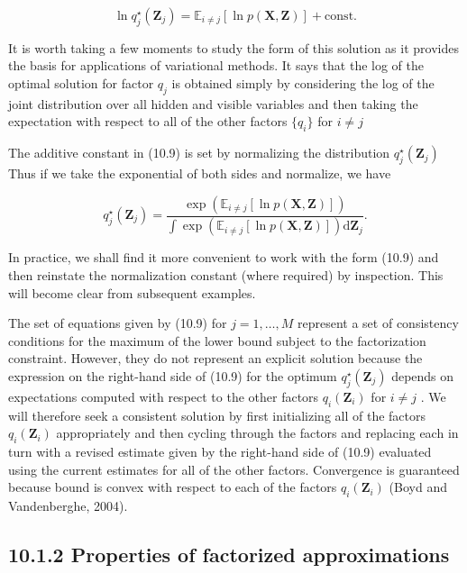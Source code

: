 \documentclass[
  10
]{article}
\begin{document}
\[
\ln q _ {j} ^ {\star} (\mathbf {Z} _ {j}) = \mathbb {E} _ {i \neq j} [ \ln p (\mathbf {X}, \mathbf {Z}) ] + \mathrm{const.}\tag{10.9}
\]

It is worth taking a few moments to study the form of this solution as
it provides the basis for applications of variational methods. It says
that the log of the optimal solution for factor \(q _ { j }\) is
obtained simply by considering the log of the joint distribution over
all hidden and visible variables and then taking the expectation with
respect to all of the other factors \(\{ q _ { i } \}\) for \(i \neq j\)

The additive constant in (10.9) is set by normalizing the distribution
\(q _ { j } ^ { \star } ( \mathbf { Z } _ { j } )\) Thus if we take the
exponential of both sides and normalize, we have

\[
q _ {j} ^ {\star} (\mathbf {Z} _ {j}) = \frac {\exp \left(\mathbb {E} _ {i \neq j} [ \ln p (\mathbf {X} , \mathbf {Z}) ]\right)}{\int \exp \left(\mathbb {E} _ {i \neq j} [ \ln p (\mathbf {X} , \mathbf {Z}) ]\right) \mathrm{d} \mathbf {Z} _ {j}}.
\]

In practice, we shall find it more convenient to work with the form
(10.9) and then reinstate the normalization constant (where required) by
inspection. This will become clear from subsequent examples.

The set of equations given by (10.9) for \(j = 1 , \dots , M\) represent
a set of consistency conditions for the maximum of the lower bound
subject to the factorization constraint. However, they do not represent
an explicit solution because the expression on the right-hand side of
(10.9) for the optimum
\(q _ { j } ^ { \star } ( \mathbf { Z } _ { j } )\) depends on
expectations computed with respect to the other factors
\(q _ { i } ( \mathbf { Z } _ { i } )\) for \(i \neq j\) . We will
therefore seek a consistent solution by first initializing all of the
factors \(q _ { i } ( \mathbf { Z } _ { i } )\) appropriately and then
cycling through the factors and replacing each in turn with a revised
estimate given by the right-hand side of (10.9) evaluated using the
current estimates for all of the other factors. Convergence is
guaranteed because bound is convex with respect to each of the factors
\(q _ { i } ( \mathbf { Z } _ { i } )\) (Boyd and Vandenberghe, 2004).

\subsection{10.1.2 Properties of factorized
approximations}\label{properties-of-factorized-approximations}
\end{document}
